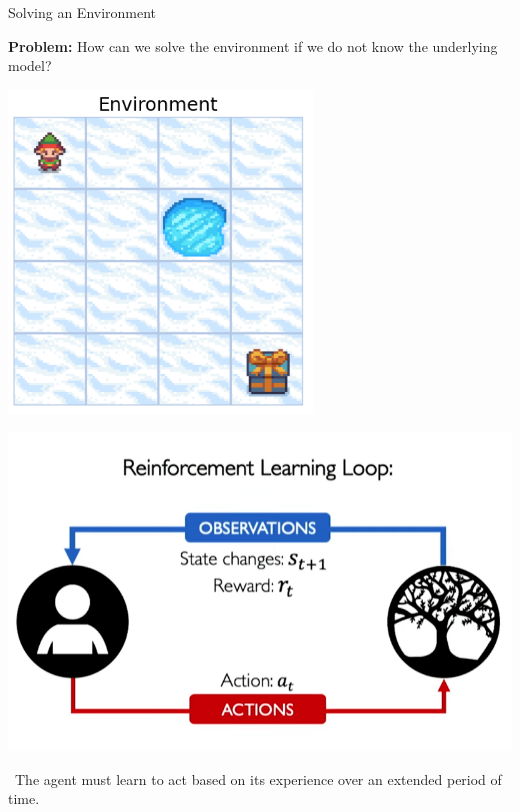 \documentclass[11pt]{beamer}
\begin{document}
\begin{frame}{Solving an Environment}

\noindent\textbf{Problem:} How can we solve the environment if we do not know the underlying model?

\vspace{.5\baselineskip}

\begin{minipage}{.5\linewidth}
\centering
\includegraphics[width=.65\linewidth]{images/Frozen_Lake} \pause
\end{minipage}\begin{minipage}{.5\linewidth}
\centering
\includegraphics[width=.9\linewidth]{images/RL_loop}
\end{minipage}

\vspace{.5\baselineskip}

\HandRight\ The agent must learn to act based on its experience over an extended period of time.

\end{frame}
\end{document}
